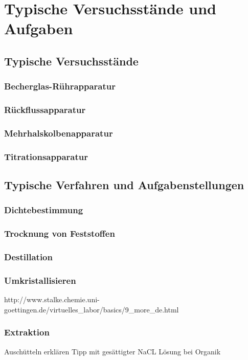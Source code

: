 \section{Typische Versuchsstände und Aufgaben}

\subsection{Typische Versuchsstände}
\subsubsection*{Becherglas-Rührapparatur}
\subsubsection*{Rückflussapparatur}
\subsubsection*{Mehrhalskolbenapparatur}
\subsubsection*{Titrationsapparatur}

\subsection{Typische Verfahren und Aufgabenstellungen}
\subsubsection*{Dichtebestimmung}
\subsubsection*{Trocknung von Feststoffen}
\subsubsection*{Destillation}
\subsubsection*{Umkristallisieren}
http://www.stalke.chemie.uni-goettingen.de/virtuelles_labor/basics/9_more_de.html
\subsubsection*{Extraktion}
\label{sec:extraktion}
Auschütteln erklären
Tipp mit gesättigter NaCL Lösung bei Organik
